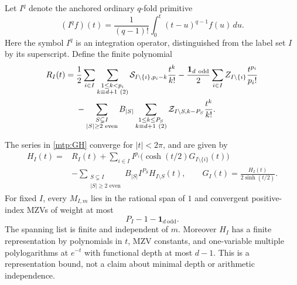 Let $I^q$ denote the anchored ordinary $q$-fold primitive
\[
 (I^qf)(t)=\frac1{(q-1)!}\int_0^t(t-u)^{q-1}f(u)\,du.
\]
Here the symbol $I^q$ is an integration operator, distinguished from
the label set $I$ by its superscript. Define the finite polynomial
\begin{align}
 R_I(t)={}&\frac12\sum_{i\in I}
       \sum_{\substack{1\le k<p_i\\k\equiv d+1\ (2)}}
          \mathcal S_{I\setminus\{i\},p_i-k}\frac{t^k}{k!}
       -\frac{\mathbf1_{d\ \mathrm{odd}}}{2}
          \sum_{i\in I}Z_{I\setminus\{i\}}\frac{t^{p_i}}{p_i!}
       \notag\\
 &-\sum_{\substack{S\subsetneq I\\|S|\ge2\text{ even}}}B_{|S|}
       \sum_{\substack{1\le k\le P_S\\k\equiv d+1\ (2)}}
          \mathcal Z_{I\setminus S,k-P_S}\frac{t^k}{k!}.
       \label{mtp:R}
\end{align}

\begin{theorem}
\label{mtp:generator}
The series in \eqref{mtp:GH} converge for $|t|<2\pi$, and are given by
\begin{equation}\label{mtp:generator-formula}
 \boxed{\begin{aligned}
 H_I(t)={}&R_I(t)
       +\sum_{i\in I}I^{p_i}\bigl(\cosh(t/2)G_{I\setminus\{i\}}(t)\bigr)\\
       &-\sum_{\substack{S\subsetneq I\\|S|\ge2\text{ even}}}
                     B_{|S|}I^{P_S}H_{I\setminus S}(t),
       \qquad G_I(t)=\frac{H_I(t)}{2\sinh(t/2)}.
 \end{aligned}}
\end{equation}
For fixed $I$, every $M_{I,m}$ lies in the rational span of $1$ and
convergent positive-index MZVs of weight at most
\begin{equation}\label{mtp:weight-bound}
                         P_I-1-\mathbf1_{d\ \mathrm{odd}}.
\end{equation}
The spanning list is finite and independent of $m$.
Moreover $H_I$ has a finite representation by polynomials in $t$,
MZV constants, and one-variable multiple polylogarithms at $e^{-t}$
with functional depth at most $d-1$. This is a representation bound,
not a claim about minimal depth or arithmetic independence.
\end{theorem}


